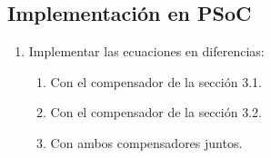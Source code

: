 \subsection{Implementación en PSoC}
\begin{enumerate}[label=4.\arabic*.]
	\item Implementar las ecuaciones en diferencias:
	\begin{enumerate}[label*=4.\arabic*.]
			\item Con el compensador de la sección 3.1.
			\item Con el compensador de la sección 3.2.
			\item Con ambos compensadores juntos.
		\end{enumerate}
\end{enumerate}
